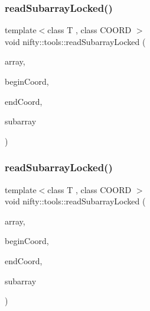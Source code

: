 \mbox{\label{namespacenifty_1_1tools_ad9c06ed1bf5a27481583971a28bf9142}} 
\subsubsection{\texorpdfstring{read\+Subarray\+Locked()}{readSubarrayLocked()}\hspace{0.1cm}{\footnotesize\ttfamily [1/2]}}
{\footnotesize\ttfamily template$<$class T , class C\+O\+O\+RD $>$ \\
void nifty\+::tools\+::read\+Subarray\+Locked (\begin{DoxyParamCaption}\item[{const \hyperlink{classandres_1_1View}{marray\+::\+View}$<$ T $>$}]{array,  }\item[{const C\+O\+O\+RD \&}]{begin\+Coord,  }\item[{const C\+O\+O\+RD \&}]{end\+Coord,  }\item[{\hyperlink{classandres_1_1View}{marray\+::\+View}$<$ T $>$ \&}]{subarray }\end{DoxyParamCaption})\hspace{0.3cm}{\ttfamily [inline]}}

\mbox{\label{namespacenifty_1_1tools_a562317b7926e706fa893b03ad3bfdfda}} 
\subsubsection{\texorpdfstring{read\+Subarray\+Locked()}{readSubarrayLocked()}\hspace{0.1cm}{\footnotesize\ttfamily [2/2]}}
{\footnotesize\ttfamily template$<$class T , class C\+O\+O\+RD $>$ \\
void nifty\+::tools\+::read\+Subarray\+Locked (\begin{DoxyParamCaption}\item[{const hdf5\+::\+Hdf5\+Array$<$ T $>$ \&}]{array,  }\item[{const C\+O\+O\+RD \&}]{begin\+Coord,  }\item[{const C\+O\+O\+RD \&}]{end\+Coord,  }\item[{\hyperlink{classandres_1_1View}{marray\+::\+View}$<$ T $>$ \&}]{subarray }\end{DoxyParamCaption})\hspace{0.3cm}{\ttfamily [inline]}}

